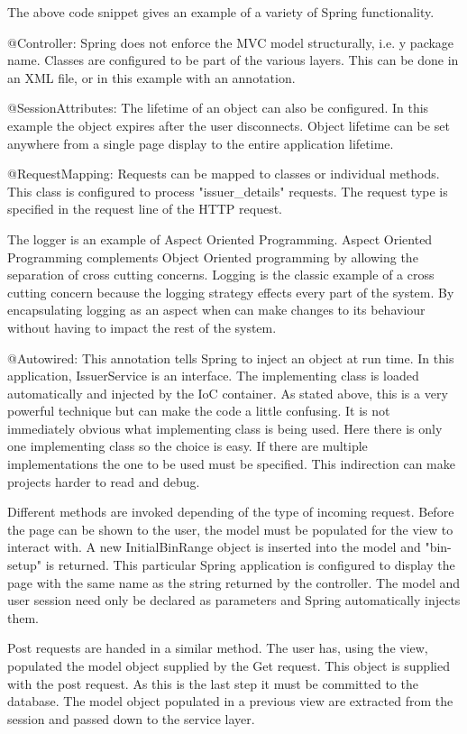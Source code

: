 \documentclass[a4paper, 11pt, titlepage]{article}
\begin{document}
The above code snippet gives an example of a variety of Spring functionality.  
 
@Controller: Spring does not enforce the MVC model structurally, i.e. y package name. Classes are configured to be part of the various layers. This can be done in an XML file, or in this example with an annotation.  
 
@SessionAttributes: The lifetime of an object can also be configured. In this example the object expires after the user disconnects. Object lifetime can be set anywhere from a single page display to the entire application lifetime. 
 
@RequestMapping: Requests can be mapped to classes or individual methods. This class is configured to process "issuer_details" requests. The request type is specified in the request line of the HTTP request. 
 
\label{aspects} 
The logger is an example of Aspect Oriented Programming. Aspect Oriented Programming complements Object Oriented programming by allowing the separation of cross cutting concerns. Logging is the classic example of a cross cutting concern because the logging strategy effects every part of the system. By encapsulating logging as an aspect when can make changes to its behaviour without having to impact the rest of the system. 
\cite{AOP} 
 
@Autowired: This annotation tells Spring to inject an object at run time. In this application, IssuerService is an interface. The implementing class is loaded automatically and injected by the IoC container. As stated above, this is a very powerful technique but can make the code a little confusing. It is not immediately obvious what implementing class is being used. Here there is only one implementing class so the choice is easy. If there are multiple implementations the one to be used must be specified. This indirection can make projects harder to read and debug. 
 
Different methods are invoked depending of the type of incoming request. Before the page can be shown to the user, the model must be populated for the view to interact with. A new InitialBinRange object is inserted into the model and "bin-setup" is returned. This particular Spring application is configured to display the page with the same name as the string returned by the controller. The model and user session need only be declared as parameters and Spring automatically injects them. 
 
Post requests are handed in a similar method. The user has, using the view, populated the model object supplied by the Get request. This object is supplied with the post request. As this is the last step it must be committed to the database. The model object populated in a previous view are extracted from the session and passed down to the service layer.  
 
\end{document}
